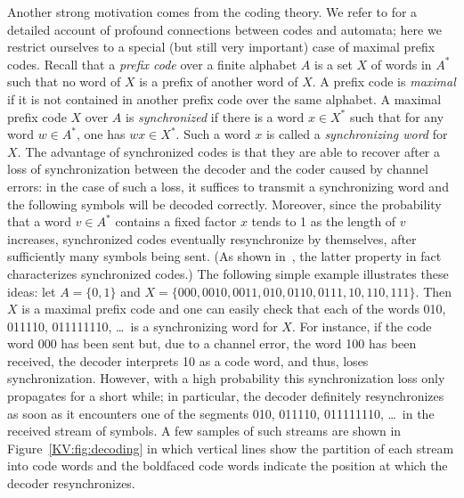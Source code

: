 \documentclass{irmaart}
\theoremstyle{plain}
\begin{document}
Another strong motivation comes from the coding theory. We refer
to \cite[Chapters~3 and~10]{Berstel&Perrin&Reutenauer:2009} for a
detailed account of profound connections between codes and
automata; here we restrict ourselves to a special (but still very
important) case of maximal prefix codes. Recall that a
\emph{prefix code} over a finite alphabet $A$
is a set $X$ of words in $A^*$ such that no word of $X$ is a
prefix of another word of $X$. A prefix code is
\emph{maximal} if it is not contained
in another prefix code over the same alphabet. A maximal prefix
code $X$ over $A$ is \emph{synchronized} if there is a word $x\in X^*$ such that for any
word $w\in A^*$, one has $wx\in X^*$. Such a word $x$ is called a
\emph{synchronizing word} for
$X$. The advantage of synchronized codes is that they are able to
recover after a loss of synchronization between the decoder and
the coder caused by channel errors: in the case of such a loss, it
suffices to transmit a synchronizing word and the following
symbols will be decoded correctly. Moreover, since the probability
that a word $v\in A^*$ contains a fixed factor $x$ tends to 1 as
the length of $v$ increases, synchronized codes eventually
resynchronize by themselves, after sufficiently many symbols being
sent. (As shown in~\cite{Capocelli&Gargano&Vaccaro:1988}, the
latter property in fact characterizes synchronized codes.) The
following simple example illustrates these ideas: let $A=\{0,1\}$
and $X=\{000,0010,0011,010,0110,0111,10,110,111\}$. Then $X$ is a
maximal prefix code and one can easily check that each of the
words 010, 011110, 011111110, \dots\ is a synchronizing word for
$X$. For instance, if the code word 000 has been sent but, due to
a channel error, the word 100 has been received, the decoder
interprets 10 as a code word, and thus, loses synchronization.
However, with a high probability this synchronization loss only
propagates for a short while; in particular, the decoder
definitely resynchronizes as soon as it encounters one of the
segments 010, 011110, 011111110, \dots\ in the received stream of
symbols. A few samples of such streams are shown in
Figure~\ref{KV:fig:decoding} in which vertical lines show the
partition of each stream into code words and the boldfaced code
words indicate the position at which the decoder resynchronizes.
\end{document}
